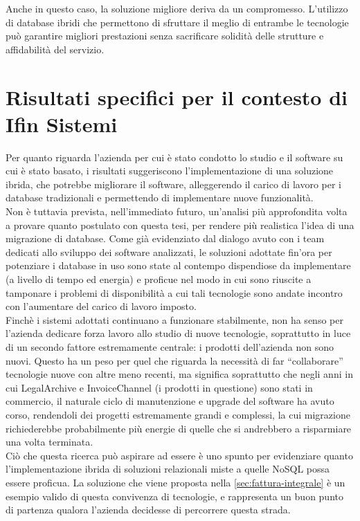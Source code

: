 \noindent Anche in questo caso, la soluzione migliore deriva da un compromesso. L'utilizzo di database ibridi che permettono di sfruttare il meglio di entrambe le tecnologie può garantire migliori prestazioni senza sacrificare solidità delle strutture e affidabilità del servizio.\\


\section{Risultati specifici per il contesto di Ifin Sistemi}
Per quanto riguarda l'azienda per cui è stato condotto lo studio e il software su cui è stato basato, i risultati suggeriscono l'implementazione di una soluzione ibrida, che potrebbe migliorare il software, alleggerendo il carico di lavoro per i database tradizionali e permettendo di implementare nuove funzionalità.\\

\noindent Non è tuttavia prevista, nell'immediato futuro, un'analisi più approfondita volta a provare quanto postulato con questa tesi, per rendere più realistica l'idea di una migrazione di database. Come già evidenziato dal dialogo avuto con i team dedicati allo sviluppo dei software analizzati, le soluzioni adottate fin'ora per potenziare i database in uso sono state al contempo dispendiose da implementare (a livello di tempo ed energia) e proficue nel modo in cui sono riuscite a tamponare i problemi di disponibilità a cui tali tecnologie sono andate incontro con l'aumentare del carico di lavoro imposto.\\
Finchè i sistemi adottati continuano a funzionare stabilmente, non ha senso per l'azienda dedicare forza lavoro allo studio di nuove tecnologie, soprattutto in luce di un secondo fattore estremamente centrale: i prodotti dell'azienda non sono nuovi. Questo ha un peso per quel che riguarda la necessità di far ``collaborare'' tecnologie nuove con altre meno recenti, ma significa soprattutto che negli anni in cui LegalArchive e InvoiceChannel (i prodotti in questione) sono stati in commercio, il naturale ciclo di manutenzione e upgrade del software ha avuto corso, rendendoli dei progetti estremamente grandi e complessi, la cui migrazione richiederebbe probabilmente più energie di quelle che si andrebbero a risparmiare una volta terminata.\\

\noindent Ciò che questa ricerca può aspirare ad essere è uno spunto per evidenziare quanto l'implementazione ibrida di soluzioni relazionali miste a quelle NoSQL possa essere proficua. La soluzione che viene proposta nella \autoref{sec:fattura-integrale} è un esempio valido di questa convivenza di tecnologie, e rappresenta un buon punto di partenza qualora l'azienda decidesse di percorrere questa strada.\\


